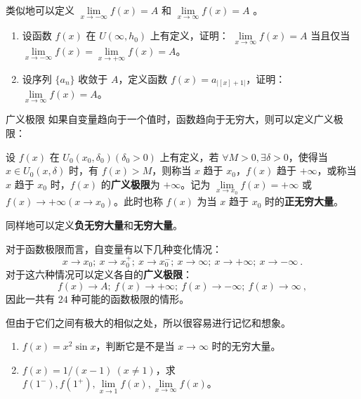   类似地可以定义 $\lim\limits_{x\rightarrow -\infty}f(x)=A$ 和 $\lim\limits_{x\rightarrow \infty}f(x)=A$ 。
\begin{exercise}{}
\begin{enumerate}
\item 设函数 $f(x)$ 在 $U(\infty,h_0)$ 上有定义，证明： $\lim\limits_{x\rightarrow \infty} f(x)=A$ 当且仅当 $\lim\limits_{x\rightarrow -\infty}f(x)=\lim\limits_{x\rightarrow +\infty}f(x)=A$。
\item 设序列 $\{a_n\}$ 收敛于 $A$，定义函数 $f(x)=a_{|[x]+1|}$，证明：$\lim\limits_{x\rightarrow \infty} f(x)=A$。
\end{enumerate}
\end{exercise}

\begin{definition}{广义极限}
如果自变量趋向于一个值时，函数趋向于无穷大，则可以定义广义极限：

  设 $f(x)$ 在 $U_0(x_0,\delta_0)(\delta_0>0)$ 上有定义，若 $\forall M>0,\exists \delta>0$，使得当 $x\in U_0(x,\delta)$ 时，有 $f(x)>M$，则称当 $x$ 趋于 $x_0$，$f(x)$ 趋于 $+\infty$，或称当 $x$ 趋于 $x_0$ 时，$f(x)$ 的\textbf{广义极限}为 $+\infty$。记为 $\lim\limits_{x\rightarrow x_0}f(x)=+\infty$ 或 $f(x)\rightarrow +\infty(x\rightarrow x_0)$。此时也称 $f(x)$ 为当 $x$ 趋于 $x_0$ 时的\textbf{正无穷大量}。

  同样地可以定义\textbf{负无穷大量}和\textbf{无穷大量}。
\end{definition}

  

  对于函数极限而言，自变量有以下几种变化情况：
\begin{equation}
  x\rightarrow x_0;\ x\rightarrow x_0^+;\ x\rightarrow x_0^{-};\ x\rightarrow \infty;\ x\rightarrow +\infty;\ x\rightarrow -\infty~.
\end{equation}
  对于这六种情况可以定义各自的\textbf{广义极限}：
\begin{equation}
  f(x)\rightarrow A;\ f(x)\rightarrow +\infty;\ f(x)\rightarrow -\infty;\ f(x)\rightarrow \infty~,
\end{equation}
  因此一共有 $24$ 种可能的函数极限的情形。

  但由于它们之间有极大的相似之处，所以很容易进行记忆和想象。

\begin{exercise}{}
\begin{enumerate}
\item $f(x)=x^2\sin x$，判断它是不是当 $x\rightarrow \infty$ 时的无穷大量。
\item $f(x)=1/(x-1)\ (x\neq 1)$，求 $f(1^-),f(1^+),\lim\limits_{x\rightarrow 1}f(x),\lim\limits_{x\rightarrow \infty}f(x)$。
\end{enumerate}
\end{exercise}
